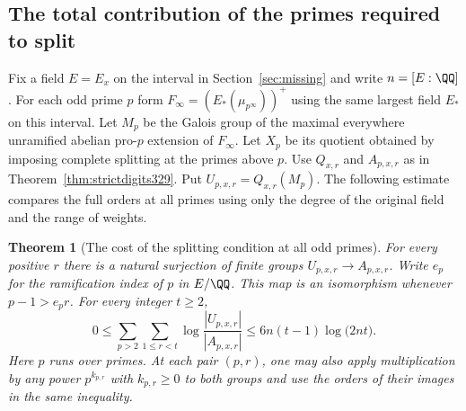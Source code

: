 \documentclass[a4paper,11pt]{article}
\newtheorem{theorem}[proposition]{Theorem}
\theoremstyle{definition}
\theoremstyle{remark}
\numberwithin{equation}{section}
\begin{document}
\subsection{The total contribution of the primes required to split}\label{nav:frobenius330}
Fix a field \(E=E_x\) on the interval in Section~\ref{sec:missing}
and write \(n=[E:\QQ]\). For each odd prime \(p\) form
\(F_\infty=(E_*(\mu_{p^\infty}))^+\) using the same largest
field \(E_*\) on this interval. Let \(M_p\) be the Galois group
of the maximal everywhere unramified abelian pro-\(p\) extension
of \(F_\infty\). Let \(X_p\) be its quotient obtained by imposing
complete splitting at the primes above \(p\).
Use \(Q_{x,r}\) and \(A_{p,x,r}\) as in
Theorem~\ref{thm:strictdigits329}. Put \(U_{p,x,r}=Q_{x,r}(M_p)\).
The following estimate compares the full orders at all primes
using only the degree of the original field and the range of weights.

\begin{theorem}[The cost of the splitting condition at all odd primes]\leavevmode
\label{thm:decomploss330}
For every positive \(r\) there is a natural surjection of finite
groups \(U_{p,x,r}\longrightarrow A_{p,x,r}\). Write
\(e_p\) for the ramification index of \(p\) in \(E/\QQ\).
This map is an isomorphism whenever \(p-1>e_pr\).
For every integer \(t\ge2\),
\begin{equation}\label{eq:decomploss330}
 0\le \sum_{p>2}\sum_{1\le r<t}
       \log\frac{|U_{p,x,r}|}{|A_{p,x,r}|}
     \le 6 n(t-1)\log\bigl(2n t\bigr).
\end{equation}
Here \(p\) runs over primes. At each pair \((p,r)\), one may
also apply multiplication by any power \(p^{k_{p,r}}\) with
\(k_{p,r}\ge0\) to both groups and use the orders of their
images in the same inequality.
\end{theorem}
\end{document}
